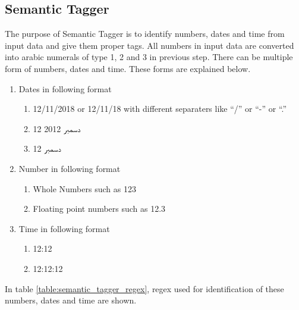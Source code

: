 \subsection{Semantic Tagger}
The purpose of Semantic Tagger is to identify numbers, dates and time from input data and give them proper tags. 
All numbers in input data are converted into arabic numerals of type 1, 2 and 3 in previous step. 
There can be multiple form of numbers, dates and time. These forms are explained below.


\begin{enumerate}    
  \item Dates in following format

  \begin{enumerate}[label=\alph*.]
    \item 12/11/2018 or 12/11/18 with different separaters like \enquote{/} or \enquote{-} or \enquote{.}
    \item \texturdu{12 دسمبر 2012}
    \item \texturdu{12 دسمبر}
  \end{enumerate}
  \item Number in following format
  \begin{enumerate}[label=\alph*.]
    \item Whole Numbers such as 123
    \item Floating point numbers such as 12.3
  \end{enumerate}

  \item Time in following format

  \begin{enumerate}[label=\alph*.]
    \item 12:12
    \item 12:12:12
  \end{enumerate}
\end{enumerate}


In table \ref{table:semantic_tagger_regex}, regex used for identification of these numbers, dates and time are shown.

